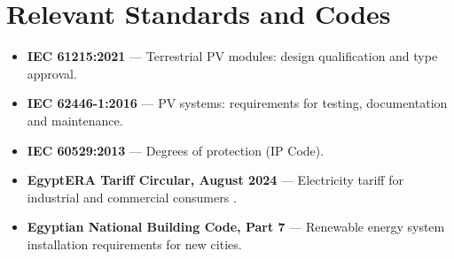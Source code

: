 \documentclass[12pt,a4paper]{report}
\numberwithin{equation}{chapter}
\numberwithin{figure}{chapter}
\numberwithin{table}{chapter}
\begin{document}
\chapter{Relevant Standards and Codes}
\label{app:standards}

\begin{itemize}[leftmargin=*]
  \item \textbf{IEC 61215:2021} --- Terrestrial PV modules: design qualification and
        type approval.
  \item \textbf{IEC 62446-1:2016} --- PV systems: requirements for testing,
        documentation and maintenance.
  \item \textbf{IEC 60529:2013} --- Degrees of protection (IP Code).
  \item \textbf{EgyptERA Tariff Circular, August 2024} --- Electricity tariff for
        industrial and commercial consumers \cite{egyptera_tariff}.
  \item \textbf{Egyptian National Building Code, Part 7} --- Renewable energy system
        installation requirements for new cities.
\end{itemize}
\end{document}
